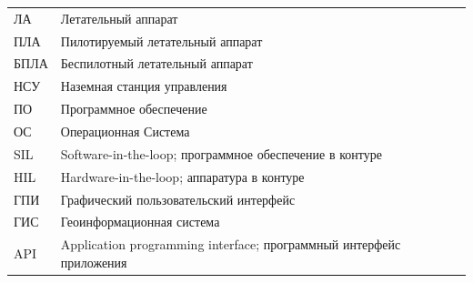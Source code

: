 \documentclass[specification,annotation]{itmo-student-thesis}
\begin{document}
\begin{table}[!h]
  \centering
  \begin{tabularx}{\textwidth}{L{0.5} L{1.5}}
    \hline
    ЛА & Летательный аппарат \\
    ПЛА & Пилотируемый летательный аппарат \\
    БПЛА & Беспилотный летательный аппарат \\
    НСУ & Наземная станция управления \\
    ПО & Программное обеспечение \\
    ОС & Операционная Система \\
    SIL & Software-in-the-loop; программное обеспечение в контуре \\
    HIL & Hardware-in-the-loop; аппаратура в контуре \\
    ГПИ & Графический пользовательский интерфейс \\
    ГИС & Геоинформационная система \\
    API & Application programming interface; программный интерфейс приложения \\
    \hline
  \end{tabularx}
\end{table}

\printmainbibliography

\appendix
\end{document}
